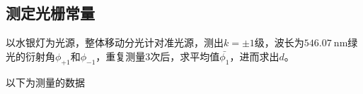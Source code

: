 \documentclass[a4paper]{article}
\begin{document}
\begin{changemargin}{1cm}{1cm}
    \clearpage

    \subsection{测定光栅常量}
    \begin{spacing}{1.6}
        以水银灯为光源，整体移动分光计对准光源，测出$k=\pm1$级，波长为$\SI{546.07}{\nm}$绿光的衍射角$\phi_{+1}$和$\phi_{-1}$，重复测量3次后，求平均值$\bar{\phi_1}$，进而求出$d$。\par
        以下为测量的数据
    \end{spacing}

    \begin{table}[htbp]
        \centering
        \captionsetup{justification=centering,margin=2cm}
        \caption{\label{tab:tab_data1}0级衍射角实验数据表}
    \end{table}\par


\end{changemargin}
\end{document}

